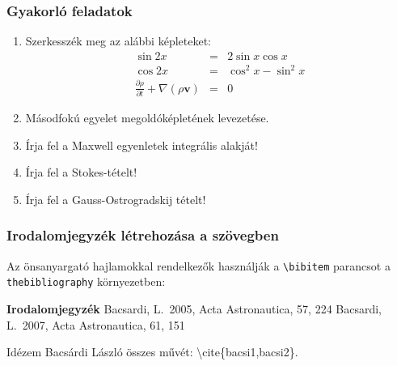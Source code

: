 \documentclass[aspectratio=169]{beamer}
\begin{document}
\begin{frame}
\frametitle{Gyakorló feladatok}

\begin{enumerate}
\item Szerkesszék meg az alábbi képleteket:
\begin{eqnarray*}
\sin 2 x &=& 2 \sin x \cos x\\
\cos 2 x &=& \cos^2 x - \sin^2 x\\
\frac{\partial\rho}{\partial t}+\nabla\left(\rho\mathbf{v}\right)&=&0
\end{eqnarray*}
\item Másodfokú egyelet megoldóképletének levezetése.
\item Írja fel a Maxwell egyenletek integrális alakját!
\item Írja fel a Stokes-tételt!
\item Írja fel a Gauss-Ostrogradskij tételt!
\end{enumerate}
\vfill
\end{frame}


\begin{frame}
\frametitle{Irodalomjegyzék létrehozása a szövegben}
Az önsanyargató hajlamokkal rendelkezők használják a \texttt{\textbackslash bibitem} parancsot a \texttt{thebibliography} környezetben:
\small
\begin{verbatim*}
\begin{thebibliography}{\textbf{Irodalomjegyzék}
Bacsardi, L.\ 2005, Acta Astronautica, 57, 224
}
Bacsardi, L.\ 2007, Acta Astronautica, 61, 151
\end{thebibliography}
\end{verbatim*}

Idézem Bacsárdi László összes művét: \textbackslash cite\{bacsi1,bacsi2\}.

\end{frame}
\end{document}

